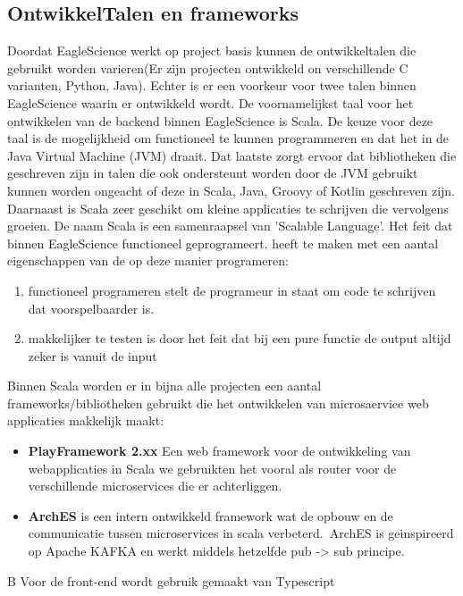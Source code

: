 \subsection{OntwikkelTalen en frameworks}\label{subsec:ontwikkeltalen-en-frameworks}
Doordat EagleScience werkt op project basis kunnen de ontwikkeltalen die gebruikt worden varieren(Er zijn projecten ontwikkeld on verschillende C varianten, Python, Java). Echter is er een voorkeur voor twee talen binnen EagleScience waarin er ontwikkeld wordt.
De voornamelijkst taal voor het ontwikkelen van de backend binnen EagleScience is Scala. De keuze voor deze taal is de mogelijkheid om functioneel te kunnen programmeren en dat het in de Java Virtual Machine (JVM) draait. Dat laatste zorgt ervoor dat bibliotheken die geschreven zijn in talen die ook ondersteunt worden door de JVM gebruikt kunnen worden ongeacht of deze in Scala, Java, Groovy of Kotlin geschreven zijn. Daarnaast is Scala zeer geschikt om kleine applicaties te schrijven die vervolgens groeien. De naam Scala is een samenraapsel van 'Scalable Language'. Het feit dat binnen EagleScience functioneel geprogrameert. heeft te maken met een aantal eigenschappen van de op deze manier programeren:
\smallskip %
\begin{enumerate}
  \item functioneel programeren stelt de programeur in staat om code te schrijven dat voorspelbaarder is.
  \item makkelijker te testen is door het feit dat bij een pure functie de output altijd zeker is vanuit de input
\end{enumerate}
Binnen Scala worden er in bijna alle projecten een aantal frameworks/bibliotheken gebruikt die het ontwikkelen van microsaervice web applicaties makkelijk maakt:
\begin{itemize}
  \item \textbf{PlayFramework 2.xx} Een web framework voor de ontwikkeling van webapplicaties in Scala we gebruikten het vooral als router voor de verschillende microservices die er achterliggen.
  \item \textbf{ArchES} is een intern ontwikkeld framework wat de opbouw en de communicatie tussen microservices in scala verbeterd.\ ArchES is geinspireerd op Apache KAFKA en werkt middels hetzelfde pub -> sub principe.
\end{itemize}

B
Voor de front-end wordt gebruik gemaakt van Typescript



